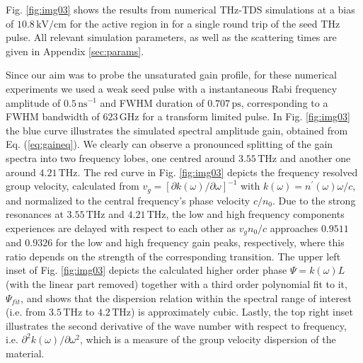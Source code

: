 \documentclass[10pt,letterpaper]{article}%
\begin{document}
Fig. \ref{fig:img03} shows the results from numerical THz-TDS simulations at a
bias of $10.8{\,}\mathrm{kV/cm}$ for the active region in
\cite{burghoff2014terahertz} for a single round trip of the seed THz
pulse\textrm{.} All relevant simulation parameters, as well as the scattering
times are given in Appendix \ref{sec:params}.

Since our aim was to probe the unsaturated gain profile, for these numerical
experiments we used a weak seed pulse with a instantaneous Rabi frequency
amplitude of $0.5{\,}\mathrm{ns}^{-1}$ and FWHM duration of $0.707{\,}%
\mathrm{ps}$, corresponding to a FWHM bandwidth of $623{\,}\mathrm{GHz}$ for a
transform limited pulse. In Fig. \ref{fig:img03} the blue curve illustrates
the simulated spectral amplitude gain, obtained from Eq. (\ref{eq:gaineq}). We
clearly can observe a pronounced splitting of the gain spectra into two
frequency lobes, one centred around $3.55{\,}\mathrm{THz}$ and another one
around $4.21{\,}\mathrm{THz}$. The red curve in Fig. \ref{fig:img03} depicts
the frequency resolved group velocity, calculated from $v_{g}=[\partial
k(\omega)/\partial\omega]^{-1}$ with $k(\omega)=n^{\prime}(\omega)\omega/c$,
and normalized to the central frequency's phase velocity\textrm{ }$c/n_{0}$.
Due to the strong resonances at $3.55{\,}\mathrm{THz}$ and $4.21{\,}%
\mathrm{THz}$, the low and high frequency components experiences are delayed
with respect to each other as $v_{g}n_{0}/c$ approaches $0.9511$ and $0.9326$
for the low and high frequency gain peaks, respectively, where this ratio
depends on the strength of the corresponding transition. The upper left inset
of Fig. \ref{fig:img03} depicts the calculated higher order phase
$\Psi=k(\omega)L$ (with the linear part removed) together with a third order
polynomial fit to it, $\Psi_{fit}$, and shows that the dispersion relation
within the spectral range of interest (i.e. from $3.5{\,}\mathrm{THz}$ to
$4.2{\,}\mathrm{THz}$) is approximately cubic. Lastly, the top right inset
illustrates the second derivative of the wave number with respect to
frequency, i.e. $\partial^{2}k(\omega)/\partial\omega^{2}$, which is a measure
of the group velocity dispersion of the material.
\end{document}
